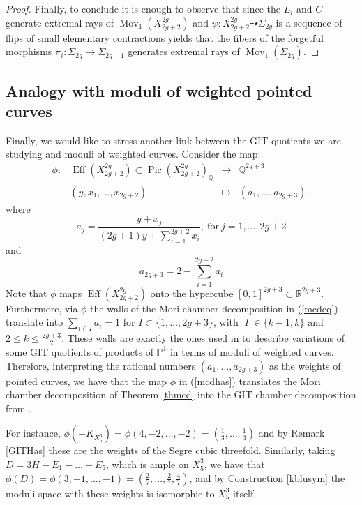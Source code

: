 \documentclass[a4paper,10pt]{amsart}
\theoremstyle{definition}
\renewcommand{\P}{\mathbb{P}}
\DeclareMathOperator{\Pic}{Pic}
\DeclareMathOperator{\Eff}{Eff}
\DeclareMathOperator{\Mov}{Mov}
\begin{document}
\begin{proof}
Finally, to conclude it is enough to observe that since the $L_i$ and $C$ generate extremal rays of $\Mov_1(X^{2g}_{2g+2})$ and $\psi: X^{2g}_{2g+2}\dasharrow \Sigma_{2g}$ is a sequence of flips of small elementary contractions \cite[Proposition 3.14]{Bar08} yields that the fibers of the forgetful morphisms $\pi_i:\Sigma_{2g}\rightarrow\Sigma_{2g-1}$ generates extremal rays of $\Mov_1(\Sigma_{2g})$.
\end{proof}

\subsection{Analogy with moduli of weighted pointed curves}
Finally, we would like to stress another link between the GIT quotients we are studying and moduli of weighted curves. Consider the map:
\begin{equation}\label{mcdhas}
\begin{array}{cccc}
\phi: &\Eff(X^{2g}_{2g+2})\subset\Pic(X^{2g}_{2g+2})_{\mathbb{Q}}& \longrightarrow & \mathbb{Q}^{2g+3}\\
      & (y,x_1,\dots,x_{2g+2}) & \longmapsto & (a_1,\dots,a_{2g+3}),
\end{array}
\end{equation}
where 
$$a_j = \frac{y+x_j}{(2g+1)y+\sum_{i=1}^{2g+2}x_i},\ \mathrm{for}\ j = 1,\dots,2g+2$$ 
and 
$$a_{2g+3} = 2-\sum_{i=1}^{2g+2}a_i$$ 
Note that $\phi$ maps $\Eff(X^{2g}_{2g+2})$ onto the hypercube $[0,1]^{2g+3}\subset\mathbb{R}^{2g+3}$. Furthermore, via $\phi$ the walls of the Mori chamber decomposition in (\ref{mcdeq}) translate into $\sum_{i\in I}a_i = 1$ for $I\subset\{1,\dots,2g+3\}$, with $|I|\in \{k-1,k\}$ and $2\leq k\leq \frac{2g+3}{2}$. These walls are exactly the ones used in \cite[Section 8]{Ha} to describe variations of some GIT quotients of products of $\P^1$ in terms of moduli of weighted curves. Therefore, interpreting the rational numbers $(a_1,\dots,a_{2g+3})$ as the weights of pointed curves, we have that the map $\phi$ in (\ref{mcdhas}) translates the Mori chamber decomposition of Theorem \ref{thmcd} into the GIT chamber decomposition from \cite[Section 8]{Ha}.

For instance, $\phi(-K_{X^3_{5}}) = \phi(4,-2,\dots,-2) = \left(\frac{1}{3},\dots,\frac{1}{3}\right)$ and by Remark \ref{GITHas} these are the weights of the Segre cubic threefold. Similarly, taking $D=3H-E_1-\dots-E_5$, which is ample on $X^{3}_5$, we have that $\phi(D) = \phi(3,-1,\dots,-1) = \left(\frac{2}{7},\dots,\frac{2}{7},\frac{4}{7}\right)$, and by Construction \ref{kblusym} the moduli space with these weights is isomorphic to $X^3_{5}$ itself. 
\end{document}
